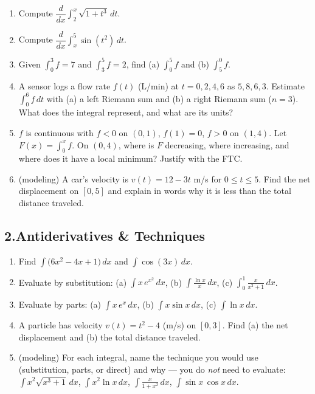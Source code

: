 \documentclass[11pt]{article}
\begin{document}
\begin{enumerate}[leftmargin=2em, itemsep=0.7em]
\item Compute $\dfrac{d}{dx}\displaystyle\int_2^{x}\sqrt{1+t^3}\,dt$.
\item Compute $\dfrac{d}{dx}\displaystyle\int_{x}^{5}\sin(t^2)\,dt$.
\item Given $\displaystyle\int_0^3 f = 7$ and $\displaystyle\int_3^5 f = 2$, find (a) $\displaystyle\int_0^5 f$ and (b) $\displaystyle\int_5^0 f$.
\item A sensor logs a flow rate $f(t)$ (L/min) at $t=0,2,4,6$ as $5, 8, 6, 3$. Estimate $\displaystyle\int_0^6 f\,dt$ with (a) a left Riemann sum and (b) a right Riemann sum ($n=3$). What does the integral represent, and what are its units?
\item $f$ is continuous with $f<0$ on $(0,1)$, $f(1)=0$, $f>0$ on $(1,4)$. Let $F(x)=\int_0^x f$. On $(0,4)$, where is $F$ decreasing, where increasing, and where does it have a local minimum? Justify with the FTC.
\item (modeling) A car's velocity is $v(t)=12-3t$ m/s for $0\le t\le 5$. Find the net displacement on $[0,5]$ and explain in words why it is less than the total distance traveled.
\end{enumerate}

\subsection*{2.\quad Antiderivatives \& Techniques}

\begin{enumerate}[leftmargin=2em, itemsep=0.7em, start=7]
\item Find $\displaystyle\int \bigl(6x^2 - 4x + 1\bigr)\,dx$ and $\displaystyle\int \cos(3x)\,dx$.
\item Evaluate by substitution: (a) $\displaystyle\int x\,e^{x^2}\,dx$, \;(b) $\displaystyle\int \frac{\ln x}{x}\,dx$, \;(c) $\displaystyle\int_0^1 \frac{x}{x^2+1}\,dx$.
\item Evaluate by parts: (a) $\displaystyle\int x\,e^{x}\,dx$, \;(b) $\displaystyle\int x\sin x\,dx$, \;(c) $\displaystyle\int \ln x\,dx$.
\item A particle has velocity $v(t)=t^2-4$ (m/s) on $[0,3]$. Find (a) the net displacement and (b) the total distance traveled.
\item (modeling) For each integral, name the technique you would use (substitution, parts, or direct) and why --- you do \emph{not} need to evaluate: \;$\displaystyle\int x^2\sqrt{x^3+1}\,dx$, \;$\displaystyle\int x^2\ln x\,dx$, \;$\displaystyle\int \frac{x}{1+x^2}\,dx$, \;$\displaystyle\int \sin x\,\cos x\,dx$.
\end{enumerate}
\end{document}
